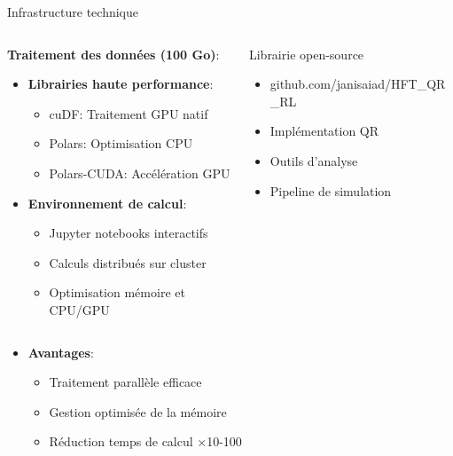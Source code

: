 \documentclass[aspectratio=169]{beamer}  %
\begin{document}
\begin{frame}{Infrastructure technique}
    \begin{columns}
        \begin{column}{0.6\textwidth}
            \textbf{Traitement des données (100 Go)}:
            \begin{itemize}
                \item \textbf{Librairies haute performance}:
                \begin{itemize}
                    \item cuDF: Traitement GPU natif
                    \item Polars: Optimisation CPU
                    \item Polars-CUDA: Accélération GPU
                \end{itemize}
                \item \textbf{Environnement de calcul}:
                \begin{itemize}
                    \item Jupyter notebooks interactifs
                    \item Calculs distribués sur cluster
                    \item Optimisation mémoire et CPU/GPU
                \end{itemize}
            \end{itemize}
        \end{column}
        \begin{column}{0.4\textwidth}
            \begin{alertblock}{Librairie open-source}
                \begin{itemize}
                    \item github.com/janisaiad/HFT\_QR\_RL
                    \item Implémentation QR
                    \item Outils d'analyse
                    \item Pipeline de simulation
                \end{itemize}
            \end{alertblock}
        \end{column}
    \end{columns}
    \vspace{0.2cm}
    \begin{itemize}
        \item \textbf{Avantages}:
        \begin{itemize}
            \item Traitement parallèle efficace
            \item Gestion optimisée de la mémoire
            \item Réduction temps de calcul ×10-100
        \end{itemize}
    \end{itemize}
\end{frame}
\end{document}
